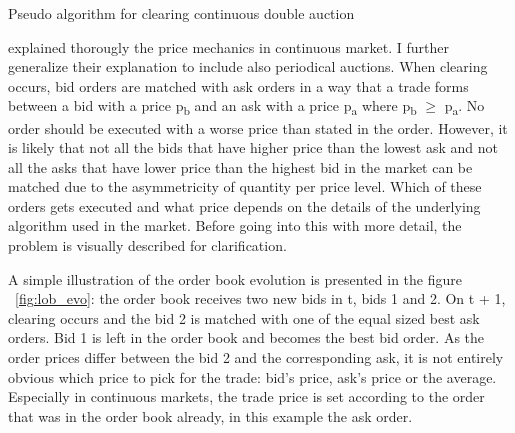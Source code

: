 \begin{algorithm}[H]
    \SetAlgoLined
    \DontPrintSemicolon

    \caption{Pseudo algorithm for clearing continuous double auction}
    \label{alg:lob_cont}
\end{algorithm}


\citet{lob13} explained thorougly the price mechanics in continuous market. I 
further generalize their explanation to include also periodical auctions.
When clearing occurs, bid orders are matched with ask orders in a way that a 
trade forms between a bid with a price p\textsubscript{b} and an ask with a price 
p\textsubscript{a} where p\textsubscript{b} $\geq$ p\textsubscript{a}. No order
should be executed with a worse price than stated in the order. However, it is likely
that not all the bids that have higher price than the lowest ask and not all the asks that
have lower price than the highest bid in the market can be matched due to the asymmetricity 
of quantity per price level. Which of these orders gets executed and what price depends on 
the details of the underlying algorithm used in the market. Before going into this with more
detail, the problem is visually described for clarification.

A simple illustration of the order book evolution is presented
in the figure ~\ref{fig:lob_evo}: the order book receives two new bids in t, bids 1 and 2.
On t + 1, clearing occurs and the bid 2 is matched with one of the equal sized best ask orders.
Bid 1 is left in the order book and becomes the best bid order. As the order prices differ
between the bid 2 and the corresponding ask, it is not entirely obvious which price to pick
for the trade: bid's price, ask's price or the average. Especially in continuous markets,
the trade price is set according to the order that was in the order book already, in this
example the ask order. %


